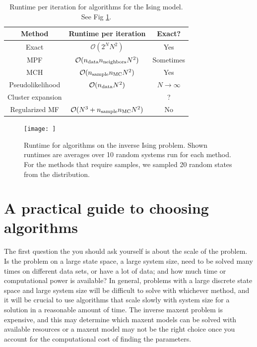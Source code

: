 \documentclass[aps,prl,twocolumn]{revtex4-1}
\begin{document}
%

\begin{table}[bt]
\caption{Runtime per iteration for algorithms for the Ising model. See Fig \ref{gr:runtime}.}
\begin{center}
\begin{tabular}{|c|c|c|}
\hline
	Method 	& Runtime per iteration & Exact? \\
\hline
	Exact 	& $\mathcal{O}(2^N N^2)$ & Yes\\
	MPF		& $\mathcal{O}(n_{\rm data}n_{\rm neighbors}N^2)$ & Sometimes\\
	MCH 	& $\mathcal{O}(n_{\rm sample}n_{\rm MC}N^2)$ & Yes\\
	Pseudolikelihood & $\mathcal{O}(n_{\rm data}N^2)$ & $N\rightarrow\infty$\\
	Cluster expansion & & ?\\
	Regularized MF & $\mathcal{O}(N^3 + n_{\rm sample}n_{\rm MC}N^2)$ & No\\
\hline
\end{tabular}
\end{center}
\label{tb:runtime}
\end{table}%

\begin{figure}[htbp]\centering
	\texttt{[image: ]}
\caption{Runtime for algorithms on the inverse Ising problem. Shown runtimes are averages over 10 random systems run for each method. For the methods that require samples, we sampled 20 random states from the distribution.}
\label{gr:runtime}
\end{figure}


\section{A practical guide to choosing algorithms}
The first question the you should ask yourself is about the scale of the problem. Is the problem on a large state space, a large system size, need to be solved many times on different data sets, or have a lot of data; and how much time or computational power is available? In general, problems with a large discrete state space and large system size will be difficult to solve with whichever method, and it will be crucial to use algorithms that scale slowly with system size for a solution in a reasonable amount of time. The inverse maxent problem is expensive, and this may determine which maxent models can be solved with available resources or a maxent model may not be the right choice once you account for the computational cost of finding the parameters.
\end{document}
